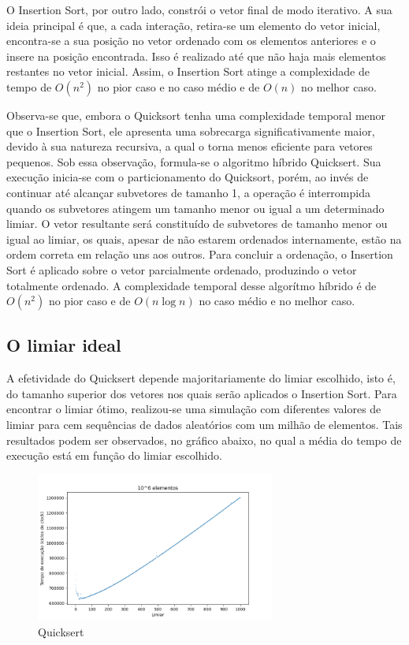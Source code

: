 \documentclass[12pt]{article}
\begin{document}
O Insertion Sort, por outro lado, constrói o vetor final de modo iterativo. A sua ideia principal é que, a cada interação, retira-se um elemento do vetor inicial, encontra-se a sua posição no vetor ordenado com os elementos anteriores e o insere na posição encontrada. Isso é realizado até que não haja mais elementos restantes no vetor inicial. Assim, o Insertion Sort atinge a complexidade de tempo de $O(n^2)$ no pior caso e no caso médio e de $O(n)$ no melhor caso.

Observa-se que, embora o Quicksort tenha uma complexidade temporal menor que o Insertion Sort, ele apresenta uma sobrecarga significativamente maior, devido à sua natureza recursiva, a qual o torna menos eficiente para vetores pequenos. Sob essa observação, formula-se o algoritmo híbrido Quicksert. Sua execução inicia-se com o particionamento do Quicksort, porém, ao invés de continuar até alcançar subvetores de tamanho 1, a operação é interrompida quando os subvetores atingem um tamanho menor ou igual a um determinado limiar. O vetor resultante será constituído de subvetores de tamanho menor ou igual ao limiar, os quais, apesar de não estarem ordenados internamente, estão na ordem correta em relação uns aos outros. Para concluir a ordenação, o Insertion Sort é aplicado sobre o vetor parcialmente ordenado, produzindo o vetor totalmente ordenado. A complexidade temporal desse algorítmo híbrido é de $O(n^2)$ no pior caso e de $O(n\log{n})$ no caso médio e no melhor caso.

\subsection{O limiar ideal}

A efetividade do Quicksert depende majoritariamente do limiar escolhido, isto é, do tamanho superior dos vetores nos quais serão aplicados o Insertion Sort. Para encontrar o limiar ótimo, realizou-se uma simulação com diferentes valores de limiar para cem sequências de dados aleatórios com um milhão de elementos. Tais resultados podem ser observados, no gráfico abaixo, no qual a média do tempo de execução está em função do limiar escolhido.

\begin{figure}[h]
    \centering
    \includegraphics[width=0.7\textwidth]{quicksert_thresholds.png}
    \caption{Quicksert}
    \label{fig:exemplo}
\end{figure}
\end{document}
